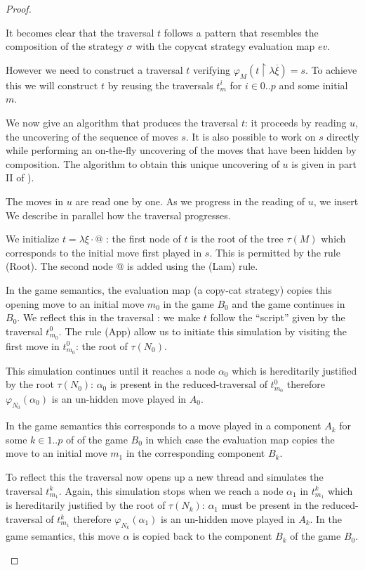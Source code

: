 \begin{proof}
\begin{itemize}
    It becomes clear that the traversal $t$ follows a pattern that resembles the composition of the strategy $\sigma$
    with the copycat strategy evaluation map $ev$.

    However we need to construct a traversal $t$ verifying $\varphi_M(t \upharpoonright \lambda \overline{\xi}) =
    s$. To achieve this we will construct $t$ by reusing the traversals $t^i_m$ for $i \in 0..p$ and some initial $m$.


    We now give an algorithm that produces the traversal $t$: it proceeds by reading $u$, the uncovering of the sequence of moves $s$.
    It is also possible to work on $s$ directly while performing an on-the-fly uncovering of the moves that have been hidden by
    composition. The algorithm to obtain this unique uncovering of $u$ is given in part II of \cite{hylandong_pcf}).

    The moves in $u$ are read one by one. As we progress in the reading of $u$, we insert
 We describe in parallel how the traversal progresses.


    We initialize $t = \lambda \xi \cdot @$ : the first node of $t$ is the
    root of the tree $\tau(M)$ which corresponds to the initial move
    first played in $s$. This is permitted by the rule (Root). The
    second node $@$ is added using the (Lam) rule.

    In the game semantics, the evaluation map (a copy-cat strategy) copies this opening move to an initial move $m_0$ in the game
    $B_0$ and the game continues in $B_0$. We reflect this in the traversal : we make $t$ follow
    the ``script'' given by the traversal $t^0_{m_0}$.
    The rule (App) allow us to initiate this simulation
    by visiting the  first move in $t^0_{m_0}$: the root of $\tau(N_0)$.

    This simulation continues until it reaches a node $\alpha_0$ which is hereditarily justified by the root
    $\tau(N_0)$: $\alpha_0$ is present in the
    reduced-traversal of $t^0_{m_0}$ therefore $\varphi_{N_0}(\alpha_0)$ is an un-hidden move played in $A_0$.

    In the game semantics this corresponds to a move played in a component $A_k$ for some $k\in 1..p$ of
    of the game $B_0$ in which case the evaluation map copies the move to an initial move $m_1$ in the corresponding component $B_k$.

    To reflect this the traversal now opens up a new thread and
    simulates the traversal $t^k_{m_1}$.
    Again, this simulation stops when we reach a node
    $\alpha_1$ in $t^k_{m_1}$ which is hereditarily justified by the root of
    $\tau(N_k)$: $\alpha_1$ must be present in the reduced-traversal
    of $t^k_{m_1}$ therefore $\varphi_{N_k}(\alpha_1)$ is an un-hidden move played in $A_k$.
    In the game semantics, this move $\alpha$ is copied
    back to the component $B_k$ of the game $B_0$.


\end{itemize}
\end{proof}
